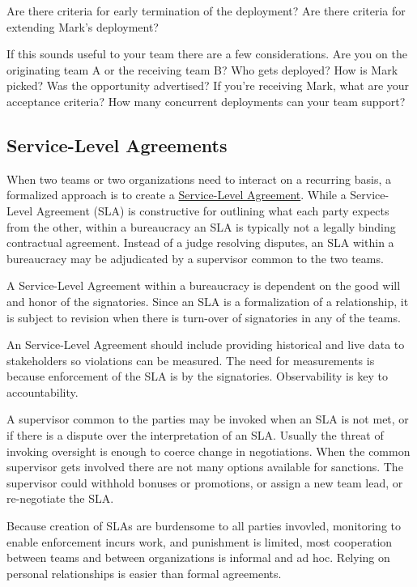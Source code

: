 Are there criteria for early termination of the deployment? Are there criteria for extending Mark's deployment?

If this sounds useful to your team there are a few considerations. Are you on the originating team A or the receiving team B? Who gets deployed? How is Mark picked? Was the opportunity advertised? If you're receiving Mark, what are your acceptance criteria? How many concurrent deployments can your team support?


\subsection*{Service-Level Agreements\label{sec:sla}}

When two teams or two organizations need to interact on a recurring basis, a formalized approach is to create a \href{https://en.wikipedia.org/wiki/Service-level_agreement}{Service-Level Agreement}. While a Service-Level Agreement (SLA) is constructive for outlining what each party expects from the other, within a bureaucracy an SLA is typically not a legally binding contractual agreement. Instead of a judge resolving disputes, an SLA within a bureaucracy may be adjudicated by a supervisor common to the two teams.

A Service-Level Agreement within a bureaucracy is dependent on the good will and honor of the signatories. Since an SLA is a formalization of a relationship, it is subject to revision when there is turn-over of signatories in any of the teams. 

An Service-Level Agreement should include providing historical and live data to stakeholders so violations can be measured. The need for measurements is because enforcement of the SLA is by the signatories. Observability is key to accountability. 

A supervisor common to the parties may be invoked when an SLA is not met, or if there is a dispute over the interpretation of an SLA. Usually the threat of invoking oversight is enough to coerce change in negotiations. 
When the common supervisor gets involved there are not many options available for sanctions. The supervisor could withhold bonuses or promotions, or assign a new team lead, or re-negotiate the SLA. 

Because creation of SLAs are burdensome to all parties invovled, monitoring to enable enforcement incurs work, and punishment is limited, most cooperation between teams and between organizations is informal and ad hoc. Relying on personal relationships is easier than formal agreements.

